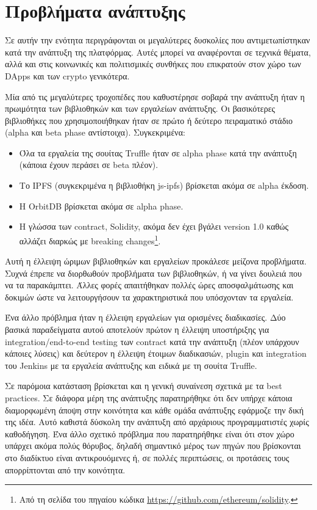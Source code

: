 \section{Προβλήματα ανάπτυξης} \label{section:4-4-problems-faced}

Σε αυτήν την ενότητα περιγράφονται οι μεγαλύτερες δυσκολίες που αντιμετωπίστηκαν κατά την ανάπτυξη της πλατφόρμας. Αυτές μπορεί να αναφέρονται σε τεχνικά θέματα, αλλά και στις κοινωνικές και πολιτισμικές συνθήκες που επικρατούν στον χώρο των DApps και των crypto γενικότερα.

Μία από τις μεγαλύτερες τροχοπέδες που καθυστέρησε σοβαρά την ανάπτυξη ήταν η πρωιμότητα των βιβλιοθηκών και των εργαλείων ανάπτυξης. Οι βασικότερες βιβλιοθήκες που χρησιμοποιήθηκαν ήταν σε πρώτο ή δεύτερο πειραματικό στάδιο (alpha και beta phase αντίστοιχα). Συγκεκριμένα:

\begin{itemize}
	\item Όλα τα εργαλεία της σουίτας Truffle ήταν σε alpha phase κατά την ανάπτυξη (κάποια έχουν περάσει σε beta πλέον).
	\item Το IPFS (συγκεκριμένα η βιβλιοθήκη js-ipfs) βρίσκεται ακόμα σε alpha έκδοση.
	\item Η OrbitDB βρίσκεται ακόμα σε alpha phase.
	\item Η γλώσσα των contract, Solidity, ακόμα δεν έχει βγάλει version 1.0 καθώς αλλάζει διαρκώς με breaking changes\footnote{Από τη σελίδα του πηγαίου κώδικα \url{https://github.com/ethereum/solidity}.}.
\end{itemize}

Αυτή η έλλειψη ώριμων βιβλιοθηκών και εργαλείων προκάλεσε μείζονα προβλήματα. Συχνά έπρεπε να διορθωθούν προβλήματα των βιβλιοθηκών, ή να γίνει δουλειά που να τα παρακάμπτει. Άλλες φορές απαιτήθηκαν πολλές ώρες αποσφαλμάτωσης και δοκιμών ώστε να λειτουργήσουν τα χαρακτηριστικά που υπόσχονταν τα εργαλεία.

Ένα άλλο πρόβλημα ήταν η έλλειψη εργαλείων για ορισμένες διαδικασίες. Δύο βασικά παραδείγματα αυτού αποτελούν πρώτον η έλλειψη υποστήριξης για integration/end-to-end testing των contract κατά την ανάπτυξη (πλέον υπάρχουν κάποιες λύσεις) και δεύτερον η έλλειψη έτοιμων διαδικασιών, plugin και integration του Jenkins με τα εργαλεία ανάπτυξης και ειδικά με τη σουίτα Truffle.

Σε παρόμοια κατάσταση βρίσκεται και η γενική συναίνεση σχετικά με τα best practices. Σε διάφορα μέρη της ανάπτυξης παρατηρήθηκε ότι δεν υπήρχε κάποια διαμορφωμένη άποψη στην κοινότητα και κάθε ομάδα ανάπτυξης εφάρμοζε την δική της ιδέα. Αυτό καθιστά δύσκολη την ανάπτυξη από αρχάριους προγραμματιστές χωρίς καθοδήγηση. Ένα άλλο σχετικό πρόβλημα που παρατηρήθηκε είναι ότι στον χώρο υπάρχει ακόμα πολύς θόρυβος, δηλαδή σημαντικό μέρος των πηγών που βρίσκονται στο διαδίκτυο είναι αντικρουόμενες ή, σε πολλές περιπτώσεις, οι προτάσεις τους απορρίπτονται από την κοινότητα.


